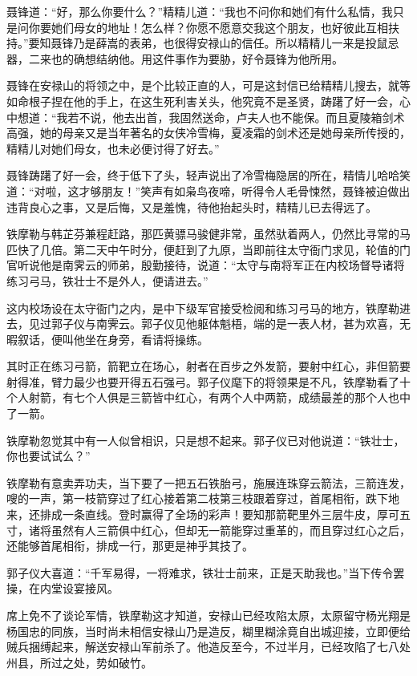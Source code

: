 \documentclass[12pt,oneside]{book}
\begin{document}
聂锋道：``好，那么你要什么？''精精儿道：``我也不问你和她们有什么私情，我只是问你要她们母女的地址！怎么样？你愿不愿意交我这个朋友，也好彼此互相扶持。''要知聂锋乃是薛嵩的表弟，也很得安禄山的信任。所以精精儿一来是投鼠忌器，二来也的确想结纳他。用这件事作为要胁，好令聂锋为他所用。

聂锋在安禄山的将领之中，是个比较正直的人，可是这封信已给精精儿搜去，就等如命根子捏在他的手上，在这生死利害关头，他究竟不是圣贤，踌躇了好一会，心中想道：``我若不说，他去出首，我固然送命，卢夫人也不能保。而且夏陵箱剑术高强，她的母亲又是当年著名的女侠冷雪梅，夏凌霜的剑术还是她母亲所传授的，精精儿对她们母女，也未必便讨得了好去。''

聂锋踌躇了好一会，终于低下了头，轻声说出了冷雪梅隐居的所在，精情儿哈哈笑道：``对啦，这才够朋友！''笑声有如枭鸟夜啼，听得令人毛骨悚然，聂锋被迫做出违背良心之事，又是后悔，又是羞愧，待他抬起头时，精精儿已去得远了。

铁摩勒与韩芷芬兼程赶路，那匹黄骠马骏健非常，虽然驮着两人，仍然比寻常的马匹快了几倍。第二天中午时分，便赶到了九原，当即前往太守衙门求见，轮值的门官听说他是南霁云的师弟，殷勤接待，说道：``太守与南将军正在内校场督导诸将练习弓马，铁壮士不是外人，便请进去。''

这内校场设在太守衙门之内，是中下级军官接受检阅和练习弓马的地方，铁摩勒进去，见过郭子仪与南霁云。郭子仪见他躯体魁梧，端的是一表人材，甚为欢喜，无暇叙话，便叫他坐在身旁，看请将操练。

其时正在练习弓箭，箭靶立在场心，射者在百步之外发箭，要射中红心，非但箭要射得准，臂力最少也要开得五石强弓。郭子仪麾下的将领果是不凡，铁摩勒看了十个人射箭，有七个人俱是三箭皆中红心，有两个人中两箭，成绩最差的那个人也中了一箭。

铁摩勒忽觉其中有一人似曾相识，只是想不起来。郭子仪已对他说道：``铁壮士，你也要试试么？''

铁摩勒有意卖弄功夫，当下要了一把五石铁胎弓，施展连珠穿云箭法，三箭连发，嗖的一声，第一枝箭穿过了红心接着第二枝第三枝跟着穿过，首尾相衔，跌下地来，还排成一条直线。登时赢得了全场的彩声！要知那箭靶里外三层牛皮，厚可五寸，诸将虽然有人三箭俱中红心，但却无一箭能穿过重革的，而且穿过红心之后，还能够首尾相衔，排成一行，那更是神乎其技了。

郭子仪大喜道：``千军易得，一将难求，铁壮士前来，正是天助我也。''当下传令罢操，在内堂设宴接风。

席上免不了谈论军情，铁摩勒这才知道，安禄山已经攻陷太原，太原留守杨光翔是杨国忠的同族，当时尚未相信安禄山乃是造反，糊里糊涂竟自出城迎接，立即便给贼兵捆缚起来，解送安禄山军前杀了。他造反至今，不过半月，已经攻陷了七八处州县，所过之处，势如破竹。
\end{document}
